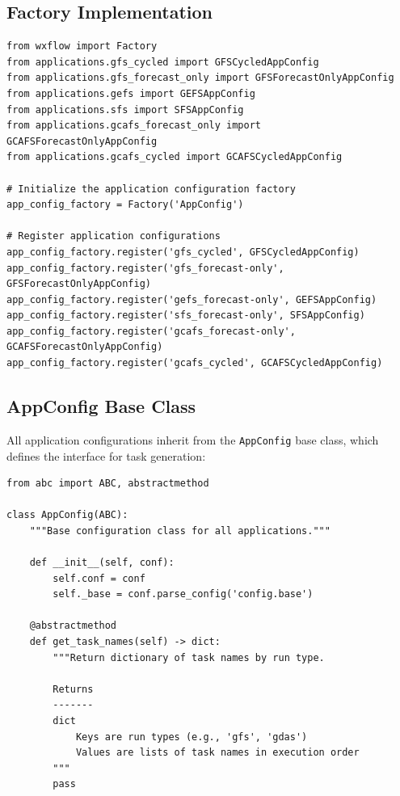 \documentclass[11pt,letterpaper]{article}
\begin{document}
\subsection{Factory Implementation}

\begin{lstlisting}[style=pythonstyle, title=application\_factory.py]
from wxflow import Factory
from applications.gfs_cycled import GFSCycledAppConfig
from applications.gfs_forecast_only import GFSForecastOnlyAppConfig
from applications.gefs import GEFSAppConfig
from applications.sfs import SFSAppConfig
from applications.gcafs_forecast_only import GCAFSForecastOnlyAppConfig
from applications.gcafs_cycled import GCAFSCycledAppConfig

# Initialize the application configuration factory
app_config_factory = Factory('AppConfig')

# Register application configurations
app_config_factory.register('gfs_cycled', GFSCycledAppConfig)
app_config_factory.register('gfs_forecast-only', GFSForecastOnlyAppConfig)
app_config_factory.register('gefs_forecast-only', GEFSAppConfig)
app_config_factory.register('sfs_forecast-only', SFSAppConfig)
app_config_factory.register('gcafs_forecast-only', GCAFSForecastOnlyAppConfig)
app_config_factory.register('gcafs_cycled', GCAFSCycledAppConfig)
\end{lstlisting}

\subsection{AppConfig Base Class}

All application configurations inherit from the \texttt{AppConfig} base class, which defines the interface for task generation:

\begin{lstlisting}[style=pythonstyle, title=applications.py (Base Class)]
from abc import ABC, abstractmethod

class AppConfig(ABC):
    """Base configuration class for all applications."""
    
    def __init__(self, conf):
        self.conf = conf
        self._base = conf.parse_config('config.base')
    
    @abstractmethod
    def get_task_names(self) -> dict:
        """Return dictionary of task names by run type.
        
        Returns
        -------
        dict
            Keys are run types (e.g., 'gfs', 'gdas')
            Values are lists of task names in execution order
        """
        pass
\end{lstlisting}
\end{document}
